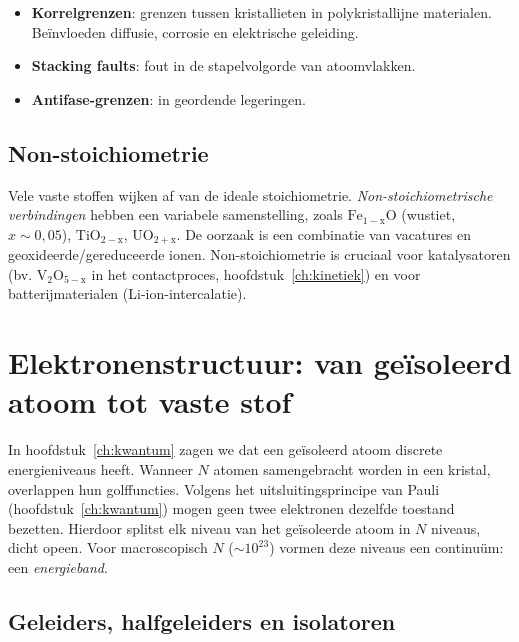 \begin{itemize}
\item \textbf{Korrelgrenzen}: grenzen tussen kristallieten in polykristallijne materialen. Be\"invloeden diffusie, corrosie en elektrische geleiding.
\item \textbf{Stacking faults}: fout in de stapelvolgorde van atoomvlakken.
\item \textbf{Antifase-grenzen}: in geordende legeringen.
\end{itemize}

\subsection{Non-stoichiometrie}

Vele vaste stoffen wijken af van de ideale stoichiometrie. \emph{Non-stoichiometrische verbindingen} hebben een variabele samenstelling, zoals $\mathrm{Fe_{1-x}O}$ (wustiet, $x \sim 0{,}05$), $\mathrm{TiO_{2-x}}$, $\mathrm{UO_{2+x}}$. De oorzaak is een combinatie van vacatures en geoxideerde/gereduceerde ionen. Non-stoichiometrie is cruciaal voor katalysatoren (bv. $\mathrm{V_2O_{5-x}}$ in het contactproces, hoofdstuk~\ref{ch:kinetiek}) en voor batterijmaterialen (Li-ion-intercalatie).

\section{Elektronenstructuur: van ge\"isoleerd atoom tot vaste stof}

In hoofdstuk~\ref{ch:kwantum} zagen we dat een ge\"isoleerd atoom discrete energieniveaus heeft. Wanneer $N$ atomen samengebracht worden in een kristal, overlappen hun golffuncties. Volgens het uitsluitingsprincipe van Pauli (hoofdstuk~\ref{ch:kwantum}) mogen geen twee elektronen dezelfde toestand bezetten. Hierdoor splitst elk niveau van het ge\"isoleerde atoom in $N$ niveaus, dicht opeen. Voor macroscopisch $N$ ($\sim10^{23}$) vormen deze niveaus een continu\"um: een \emph{energieband}.

\subsection{Geleiders, halfgeleiders en isolatoren}

